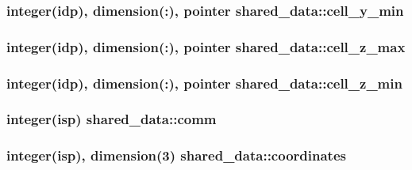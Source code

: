 \subsubsection[{\texorpdfstring{cell\+\_\+y\+\_\+min}{cell_y_min}}]{\setlength{\rightskip}{0pt plus 5cm}integer(idp), dimension(\+:), pointer shared\+\_\+data\+::cell\+\_\+y\+\_\+min}\hypertarget{namespaceshared__data_ae56bf14b4506902ecafbf55e116d20ce}{}\label{namespaceshared__data_ae56bf14b4506902ecafbf55e116d20ce}
\subsubsection[{\texorpdfstring{cell\+\_\+z\+\_\+max}{cell_z_max}}]{\setlength{\rightskip}{0pt plus 5cm}integer(idp), dimension(\+:), pointer shared\+\_\+data\+::cell\+\_\+z\+\_\+max}\hypertarget{namespaceshared__data_a77325d94a7eab8f2fd6f3ff431d9a2a3}{}\label{namespaceshared__data_a77325d94a7eab8f2fd6f3ff431d9a2a3}
\subsubsection[{\texorpdfstring{cell\+\_\+z\+\_\+min}{cell_z_min}}]{\setlength{\rightskip}{0pt plus 5cm}integer(idp), dimension(\+:), pointer shared\+\_\+data\+::cell\+\_\+z\+\_\+min}\hypertarget{namespaceshared__data_afecb94589cd67cd5d41a3fedbda6f373}{}\label{namespaceshared__data_afecb94589cd67cd5d41a3fedbda6f373}
\subsubsection[{\texorpdfstring{comm}{comm}}]{\setlength{\rightskip}{0pt plus 5cm}integer(isp) shared\+\_\+data\+::comm}\hypertarget{namespaceshared__data_a7487068a99e504a127a343402734b57b}{}\label{namespaceshared__data_a7487068a99e504a127a343402734b57b}
\subsubsection[{\texorpdfstring{coordinates}{coordinates}}]{\setlength{\rightskip}{0pt plus 5cm}integer(isp), dimension(3) shared\+\_\+data\+::coordinates}\hypertarget{namespaceshared__data_afafd7a6c030e4a324d60bdaf80cdf1fc}{}\label{namespaceshared__data_afafd7a6c030e4a324d60bdaf80cdf1fc}
